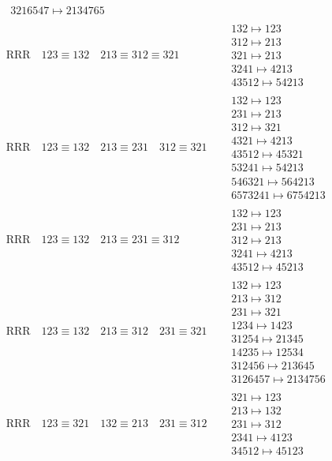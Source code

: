 \documentclass{article}
\begin{document}
\begin{align}
\begin{matrix}
\\
3216547 \mapsto 2134765
\end{matrix}
\\
\text{RRR}
\quad
123\equiv132
\quad
213\equiv312\equiv321
\quad
&
\begin{matrix}
132 \mapsto 123
\\
312 \mapsto 213
\\
321 \mapsto 213
\\
3241 \mapsto 4213
\\
43512 \mapsto 54213
\end{matrix}
\\
\text{RRR}
\quad
123\equiv132
\quad
213\equiv231
\quad
312\equiv321
\quad
&
\begin{matrix}
132 \mapsto 123
\\
231 \mapsto 213
\\
312 \mapsto 321
\\
4321 \mapsto 4213
\\
43512 \mapsto 45321
\\
53241 \mapsto 54213
\\
546321 \mapsto 564213
\\
6573241 \mapsto 6754213
\end{matrix}
\\
\text{RRR}
\quad
123\equiv132
\quad
213\equiv231\equiv312
\quad
&
\begin{matrix}
132 \mapsto 123
\\
231 \mapsto 213
\\
312 \mapsto 213
\\
3241 \mapsto 4213
\\
43512 \mapsto 45213
\end{matrix}
\\
\text{RRR}
\quad
123\equiv132
\quad
213\equiv312
\quad
231\equiv321
\quad
&
\begin{matrix}
132 \mapsto 123
\\
213 \mapsto 312
\\
231 \mapsto 321
\\
1234 \mapsto 1423
\\
31254 \mapsto 21345
\\
14235 \mapsto 12534
\\
312456 \mapsto 213645
\\
3126457 \mapsto 2134756
\end{matrix}
\\
\text{RRR}
\quad
123\equiv321
\quad
132\equiv213
\quad
231\equiv312
\quad
&
\begin{matrix}
321 \mapsto 123
\\
213 \mapsto 132
\\
231 \mapsto 312
\\
2341 \mapsto 4123
\\
34512 \mapsto 45123
\end{matrix}
\end{align}
\end{document}
